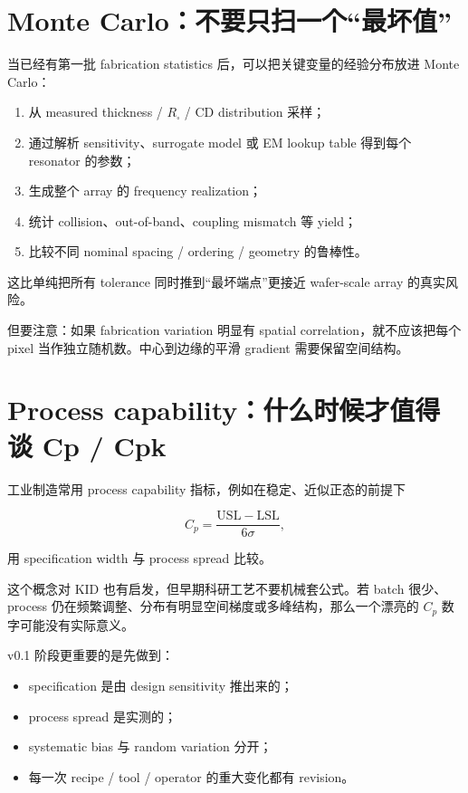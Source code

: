 \section{Monte Carlo：不要只扫一个“最坏值”}

当已经有第一批 fabrication statistics 后，可以把关键变量的经验分布放进 Monte Carlo：

\begin{enumerate}
  \item 从 measured thickness / $R_\square$ / CD distribution 采样；
  \item 通过解析 sensitivity、surrogate model 或 EM lookup table 得到每个 resonator 的参数；
  \item 生成整个 array 的 frequency realization；
  \item 统计 collision、out-of-band、coupling mismatch 等 yield；
  \item 比较不同 nominal spacing / ordering / geometry 的鲁棒性。
\end{enumerate}

这比单纯把所有 tolerance 同时推到“最坏端点”更接近 wafer-scale array 的真实风险。

但要注意：如果 fabrication variation 明显有 spatial correlation，就不应该把每个 pixel 当作独立随机数。中心到边缘的平滑 gradient 需要保留空间结构。

\section{Process capability：什么时候才值得谈 Cp / Cpk}

工业制造常用 process capability 指标，例如在稳定、近似正态的前提下

\[
C_p=\frac{\mathrm{USL}-\mathrm{LSL}}{6\sigma},
\]

用 specification width 与 process spread 比较。

这个概念对 KID 也有启发，但早期科研工艺不要机械套公式。若 batch 很少、process 仍在频繁调整、分布有明显空间梯度或多峰结构，那么一个漂亮的 $C_p$ 数字可能没有实际意义。

v0.1 阶段更重要的是先做到：

\begin{itemize}
  \item specification 是由 design sensitivity 推出来的；
  \item process spread 是实测的；
  \item systematic bias 与 random variation 分开；
  \item 每一次 recipe / tool / operator 的重大变化都有 revision。
\end{itemize}

